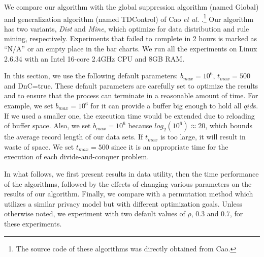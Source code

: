 We compare our algorithm with the
global suppression algorithm (named Global) and generalization algorithm
(named TDControl) of
Cao {\em et al.} \cite{Cao:2010:rho}.\footnote{The source code of these
algorithms was directly obtained from Cao.}
Our algorithm has two variants, {\em Dist} and {\em Mine}, which optimize
for data distribution and rule mining, respectively.
Experiments that failed to complete in 2 hours is marked
as ``N/A'' or an empty place in the bar charts.
We run all the experiments on Linux 2.6.34 with an 
Intel 16-core 2.4GHz CPU and 8GB RAM.


In this section, we use the following default parameters:
$b_{max} = 10^6$, $t_{max}=500$ and DnC=true.
These default parameters are carefully set to optimize the results
and to ensure that the process can terminate in a reasonable
amount of time.
For example, we set $b_{max} = 10^6$ for it can provide a buffer
big enough to hold all $qid$s. If we used a smaller one,
the execution time would be extended due to reloading of buffer
space. Also, we set $b_{max} = 10^6$ because $log_2(10^6) \approx 20$,
which bounds the average record length of our data sets.
If $t_{max}$ is too large, it will result in waste of
space. We set $t_{max} = 500$ since it is an appropriate time
for the execution of each divide-and-conquer problem. 

In what follows, we first present results in data utility, then the
time performance of the algorithms, followed by the effects of
changing various parameters on the results of our algorithm.
Finally, we compare with a permutation method which utilizes
a similar privacy model but with different optimization goals.
Unless otherwise noted, we experiment with two default values of $\rho$,
$0.3$ and $0.7$, for these experiments.


